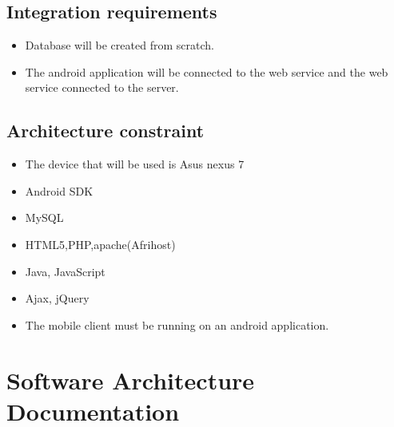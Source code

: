 \documentclass[10pt,a4paper]{article}
\begin{document}
\subsection{Integration requirements}
\begin{itemize} 
\item Database will be created from scratch.
\item The android application will be connected to the web service and the web service connected to the server.
\end{itemize}
   
\subsection{Architecture constraint}                       
\begin{itemize}
\item The device that will be used is Asus nexus 7
\item Android SDK
\item MySQL
\item HTML5,PHP,apache(Afrihost)
\item Java, JavaScript
\item Ajax, jQuery
\item The mobile client must be running on an android application.
\end{itemize}
\pagebreak

\section{Software Architecture Documentation}
\end{document}
